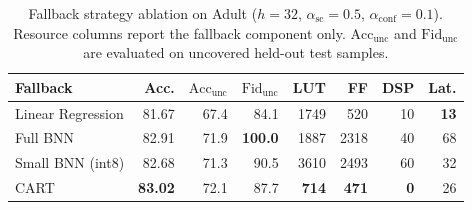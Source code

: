 \begin{table}[t]
\centering
\caption{Fallback strategy ablation on Adult ($h=32$, $\alpha_{\mathrm{sc}}=0.5$, $\alpha_{\mathrm{conf}}=0.1$). Resource columns report the fallback component only. $\mathrm{Acc}_{\mathrm{unc}}$ and $\mathrm{Fid}_{\mathrm{unc}}$ are evaluated on uncovered held-out test samples.}
\label{tab:fallback-ablation}
\begin{tabular}{lrrrrrrr}
\toprule
Fallback & Acc. & $\mathrm{Acc}_{\mathrm{unc}}$ & $\mathrm{Fid}_{\mathrm{unc}}$ & LUT & FF & DSP & Lat. \\
\midrule
Linear Regression & 81.67 & 67.4 & 84.1 & 1749 & 520 & 10 & \textbf{13} \\
Full BNN & 82.91 & 71.9 & \textbf{100.0} & 1887 & 2318 & 40 & 68 \\
Small BNN (int8) & 82.68 & 71.3 & 90.5 & 3610 & 2493 & 60 & 32 \\
CART & \textbf{83.02} & 72.1 & 87.7 & \textbf{714} & \textbf{471} & \textbf{0} & 26 \\
\bottomrule
\end{tabular}
\end{table}
